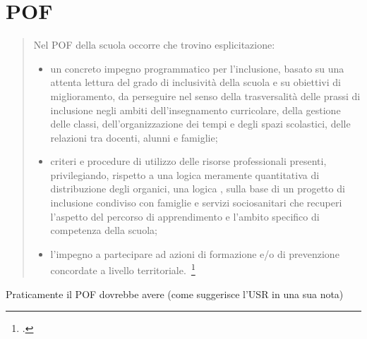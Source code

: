 \section{POF}
\begin{quote}
	Nel POF della scuola occorre che trovino esplicitazione:
	\begin{itemize}
		\item un concreto impegno programmatico per l'inclusione, basato su una attenta lettura del
		grado di inclusività della scuola e su obiettivi di miglioramento, da perseguire nel senso
		della trasversalità delle prassi di inclusione negli ambiti dell'insegnamento curricolare,
		della gestione delle classi, dell'organizzazione dei tempi e degli spazi scolastici, delle
		relazioni tra docenti, alunni e famiglie;
		\item criteri e procedure di utilizzo  delle risorse professionali presenti,
		privilegiando, rispetto a una logica meramente quantitativa di distribuzione degli
		organici, una logica , sulla base di un progetto di inclusione condiviso con
		famiglie e servizi sociosanitari che recuperi l'aspetto  del percorso di
		apprendimento e l'ambito specifico di competenza della scuola;
		\item l'impegno a partecipare ad azioni di formazione e/o di prevenzione concordate a livello
		territoriale.~\footcite{cm8_2013}
	\end{itemize}
\end{quote}
Praticamente il POF dovrebbe avere (come suggerisce l'USR  in una sua nota) 
